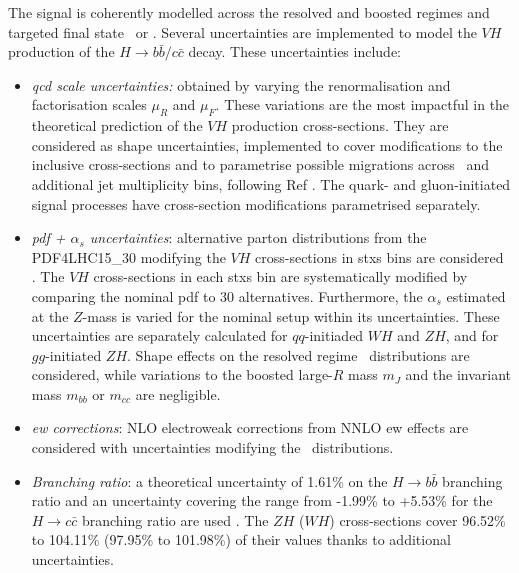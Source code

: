 The signal is coherently modelled across the resolved and boosted regimes and targeted final state \vhb\ or \vhc. Several uncertainties are implemented to model the $VH$ production of the $H \rightarrow b\bar{b}/c\bar{c}$ decay. These uncertainties include:
\begin{itemize}
    \item \textit{\gls{qcd} scale uncertainties:} obtained by varying the renormalisation and factorisation scales $\mu_R$ and $\mu_F$. These variations are the most impactful in the theoretical prediction of the $VH$ production cross-sections. They are considered as shape uncertainties, implemented to cover modifications to the inclusive cross-sections and to parametrise possible migrations across \ptv\ and additional jet multiplicity bins, following Ref \cite{ATL-PHYS-PUB-2018-035}. The quark- and gluon-initiated signal processes have cross-section modifications parametrised separately. 
    \item \textit{\gls{pdf} + $\alpha_s$ uncertainties}: alternative parton distributions from the \textsc{PDF4LHC15\_30} modifying the $VH$ cross-sections in \gls{stxs} bins are considered  \cite{Butterworth:2015oua}. The $VH$ cross-sections in each \gls{stxs} bin are systematically modified by comparing the nominal \gls{pdf} to 30 alternatives. Furthermore, the $\alpha_s$ estimated at the $Z$-mass is varied for the nominal setup within its uncertainties. These uncertainties are separately calculated for $qq$-initiaded $WH$ and $ZH$, and for $gg$-initiated $ZH$. Shape effects on the resolved regime \ptv\ distributions are considered, while variations to the boosted large-$R$ mass $m_J$ and the invariant mass $m_{bb}$ or $m_{cc}$ are negligible.
    \item \textit{\gls{ew} corrections}: NLO electroweak corrections from NNLO \gls{ew} effects are considered with uncertainties modifying the \ptv\ distributions.
    \item \textit{Branching ratio}: a theoretical uncertainty of 1.61\% on the $H \rightarrow{b\bar{b}}$ branching ratio and an uncertainty covering the range from -1.99\% to +5.53\% for the $H \rightarrow{c\bar{c}}$ branching ratio are used \cite{LHCHiggsCrossSectionWorkingGroup:2016ypw}. The $ZH$ ($WH$) cross-sections cover 96.52\% to 104.11\% (97.95\% to 101.98\%) of their values thanks to additional uncertainties.

\end{itemize}
